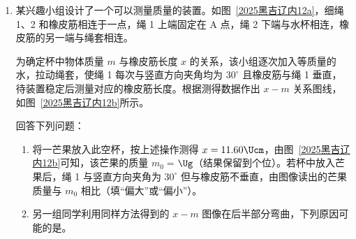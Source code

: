 \documentclass[\gkver]{gaokaozhenti}
\begin{document}
\begin{enumerate}

\item
某兴趣小组设计了一个可以测量质量的装置。如图~\ref{2025黑吉辽内12a}，细绳 1、2 和橡皮筋相连于一点，绳 1 上端固定在 A 点，绳 2 下端与水杯相连，橡皮筋的另一端与绳套相连。

为确定杯中物体质量 $m$ 与橡皮筋长度 $x$ 的关系，该小组逐次加入等质量的水，拉动绳套，使绳 1 每次与竖直方向夹角均为 $30^\circ$ 且橡皮筋与绳 1 垂直，待装置稳定后测量对应的橡皮筋长度。根据测得数据作出 $x-m$ 关系图线，如图~\ref{2025黑吉辽内12b}所示。

回答下列问题：
\begin{enumerate}
\item
将一芒果放入此空杯，按上述操作测得 $x = 11.60 \Ucm$，由图~\ref{2025黑吉辽内12b}可知，该芒果的质量 $m_{0} =$$\Ug$（结果保留到个位）。若杯中放入芒果后，绳 1 与竖直方向夹角为 $30^\circ$ 但与橡皮筋不垂直，由图像读出的芒果质量与 $m_{0}$ 相比（填“偏大”或“偏小”）。
\item
另一组同学利用同样方法得到的 $x-m$ 图像在后半部分弯曲，下列原因可能的是。


\end{enumerate}
\end{enumerate}
\end{document}
